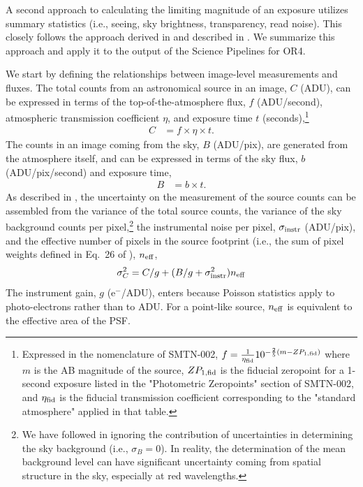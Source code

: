 \documentclass[DM,authoryear,toc]{lsstdoc}
\begin{document}
A second approach to calculating the limiting magnitude of an exposure utilizes summary statistics (i.e., seeing, sky brightness, transparency, read noise). This closely follows the approach derived in \citet{LSE-40} and described in \citet{SMTN-002}. We summarize this approach and apply it to the output of the Science Pipelines for OR4.

We start by defining the relationships between image-level measurements and fluxes. The total counts from an astronomical source in an image, $C$ (ADU), can be expressed in terms of the  top-of-the-atmosphere flux, $f$ (ADU/second), atmospheric transmission coefficient $\eta$, and exposure time $t$ (seconds),\footnote{Expressed in the nomenclature of SMTN-002,
$f = \frac{1}{\eta_{\rm fid}} 10^{-\frac{2}{5}(m - ZP_{1, {\rm fid}})}$
where $m$ is the AB magnitude of the source, $ZP_{1,{\rm fid}}$ is the fiducial zeropoint for a 1-second exposure listed in the "Photometric Zeropoints" section of SMTN-002, and $\eta_{\rm fid}$ is the fiducial transmission coefficient corresponding to the "standard atmosphere" applied in that table.}
\begin{align}
\label{eqn:source_counts}
C &= f \times \eta \times t.
\end{align}
The counts in an image coming from the sky, $B$ (ADU/pix), are generated from the atmosphere itself, and can be expressed in terms of the sky flux, $b$ (ADU/pix/second) and exposure time,
\begin{align}
\label{eqn:sky_counts}
B &= b \times t.
\end{align}
As described in \citet{LSE-40}, the uncertainty on the measurement of the source counts can be assembled from the variance of the total source counts, the variance of the sky background counts per pixel,\footnote{We have followed \citet{LSE-40} in ignoring the contribution of uncertainties in determining the sky background (i.e., $\sigma_B = 0$). In reality,  the determination of the mean background level can have significant uncertainty coming from spatial structure in the sky, especially at red wavelengths.} the instrumental noise per pixel, $\sigma_{\rm instr}$ (ADU/pix), and the effective number of pixels in the source footprint (i.e., the sum of pixel weights defined in Eq.~26 of \citealt{LSE-40}), $n_{\rm eff}$,
\begin{equation}
    \sigma_C^2 = C/g + (B/g + \sigma_{\rm instr}^2)  n_{\rm eff}
\end{equation}
The instrument gain, $g$ (e$^-$/ADU), enters because Poisson statistics apply to photo-electrons rather than to ADU.  For a point-like source, $n_{\rm eff}$ is equivalent to the effective area of the PSF.
\end{document}
